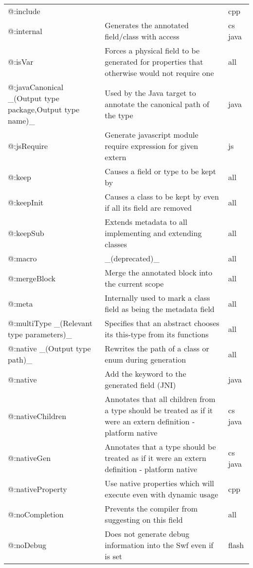 \begin{center}
\begin{tabular}{| l | l | l |}
	@:include &     &  cpp \\
	@:internal  &  Generates the annotated field/class with \expr{internal} access  &  cs  java \\
	@:isVar  &  Forces a physical field to be generated for properties that otherwise would not require one  &  all \\
	@:javaCanonical \_(Output type package,Output type name)\_ &  Used by the Java target to annotate the canonical path of the type  &  java \\
	@:jsRequire  &  Generate javascript module require expression for given extern  &  js \\
	@:keep   &  Causes a field or type to be kept by \tref{DCE}{cr-dce}  &  all \\
	@:keepInit  &  Causes a class to be kept by \tref{DCE}{cr-dce} even if all its field are removed  &  all \\
	@:keepSub &  Extends \expr{@:keep} metadata to all implementing and extending classes  &  all \\
	@:macro  &  \_(deprecated)\_  &  all \\
	@:mergeBlock  &  Merge the annotated block into the current scope  &  all \\
	@:meta   &  Internally used to mark a class field as being the metadata field  &  all \\
	@:multiType \_(Relevant type parameters)\_  &  Specifies that an abstract chooses its this-type from its \expr{@:to} functions  &  all \\
	@:native \_(Output type path)\_  &  Rewrites the path of a class or enum during generation  &  all \\
	@:native  &  Add the \expr{native} keyword to the generated field (JNI)  &  java \\
	@:nativeChildren  &  Annotates that all children from a type should be treated as if it were an extern definition - platform native  &  cs java \\
	@:nativeGen  &  Annotates that a type should be treated as if it were an extern definition - platform native  &  cs  java \\
	@:nativeProperty  &  Use native properties which will execute even with dynamic usage  &  cpp \\
	@:noCompletion  &  Prevents the compiler from suggesting \tref{completion}{cr-completion} on this field  &  all \\
	@:noDebug &  Does not generate debug information into the Swf even if \expr{--debug} is set   &  flash \\

\end{tabular}
\end{center}
